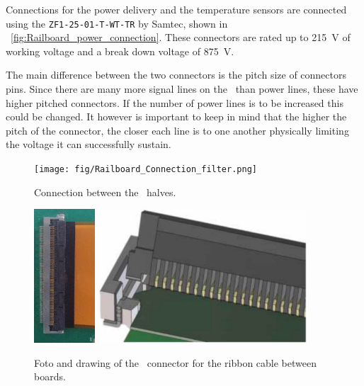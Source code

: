 \documentclass[../BTOF_summary.tex]{subfiles}
\begin{document}
Connections for the power delivery and the temperature sensors are connected using the \texttt{ZF1-25-01-T-WT-TR} by Samtec, shown in \fig~\ref{fig:Railboard_power_connection}.
These connectors are rated up to \SI{215}{V} of working voltage and a break down voltage of \SI{875}{V}.

The main difference between the two connectors is the pitch size of connectors pins.
Since there are many more signal lines on the \railboard\ than power lines, these have higher pitched connectors.
If the number of power lines is to be increased this could be changed.
It however is important to keep in mind that the higher the pitch of the connector, the closer each line is to one another physically limiting the voltage it can successfully sustain.

\begin{figure}[htbp]
	\centering
	\texttt{[image: fig/Railboard\_Connection\_filter.png]}
	\caption{Connection between the \railboard\ halves.}
	\label{fig:Railboard_connection}
\end{figure}

\begin{figure}[htbp]
	\centering
	\includegraphics[height=5cm]{fig/LargeConnector_cable_crop.jpg}
	\includegraphics[height=5cm]{fig/hirose_connector_drawing.png}
	\caption{Foto and drawing of the \railboard\ connector for the ribbon cable between boards.}
	\label{fig:Railboard_connector}
\end{figure}
\end{document}

